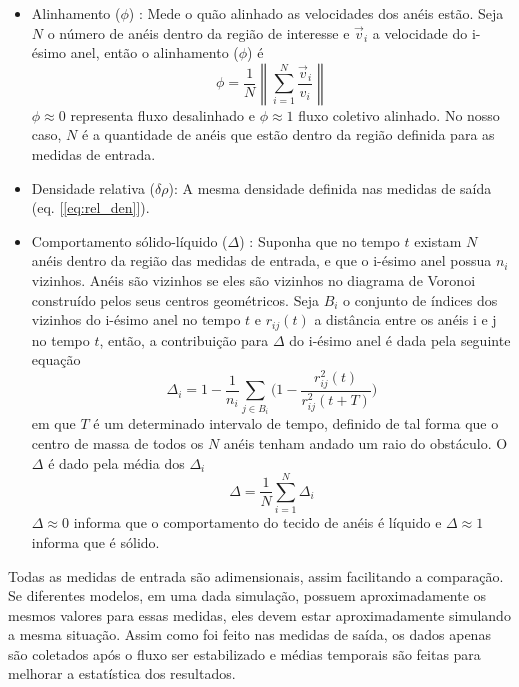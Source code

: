 \documentclass{article}
\theoremstyle{definition}
\newcommand\norm[1]{\left\lVert#1\right\rVert}
\begin{document}
\begin{itemize}
    \item Alinhamento ($\phi$) \cite{vicsek_novel_1995}: Mede o quão alinhado as velocidades dos anéis estão. Seja $N$ o número de anéis dentro da região de interesse e $\vec v_{i}$ a velocidade do i-ésimo anel, então o alinhamento ($\phi$) é
    \begin{equation}
    \phi = \frac{1}{N} \norm{\sum_{i=1}^N \frac{\vec v_{i}}{v_{i}}}
    \label{eq:input_alignment}
    \end{equation}
    $\phi \approx 0$ representa fluxo desalinhado e $\phi \approx 1$ fluxo coletivo alinhado. No nosso caso, $N$ é a quantidade de anéis que estão dentro da região definida para as medidas de entrada.

    \item Densidade relativa ($\delta \rho$): A mesma densidade definida nas medidas de saída (eq. [\ref{eq:rel_den}]).

    \item Comportamento sólido-líquido ($\Delta$) \cite{gregoire_moving_2003}: Suponha que no tempo $t$ existam $N$ anéis dentro da região das medidas de entrada, e que o i-ésimo anel possua $n_i$ vizinhos. Anéis são vizinhos se eles são vizinhos no diagrama de Voronoi \cite{voronoi} construído pelos seus centros geométricos. Seja $B_i$ o conjunto de índices dos vizinhos do i-ésimo anel no tempo $t$ e $r_{ij}(t)$ a distância entre os anéis i e j no tempo $t$, então, a contribuição para $\Delta$ do i-ésimo anel é dada pela seguinte equação
    \begin{equation}
    \Delta_i = 1 - \frac{1}{n_i}\sum_{j \in B_i}\bigg(1 - \frac{r_{ij}^2(t)}{r_{ij}^2(t + T)} \bigg)
    \label{eq:delta_i}
    \end{equation}
    em que $T$ é um determinado intervalo de tempo, definido de tal forma que o centro de massa de todos os $N$ anéis tenham andado um raio do obstáculo. O $\Delta$ é dado pela média dos $\Delta_i$
    \begin{equation}
        \Delta = \frac{1}{N}\sum_{i=1}^N\Delta_i
        \label{eq:delta}
    \end{equation}
    $\Delta \approx 0$ informa que o comportamento do tecido de anéis é líquido e $\Delta \approx 1$ informa que é sólido. 
\end{itemize}
Todas as medidas de entrada são adimensionais, assim facilitando a comparação. Se diferentes modelos, em uma dada simulação, possuem aproximadamente os mesmos valores para essas medidas, eles devem estar aproximadamente simulando a mesma situação. Assim como foi feito nas medidas de saída, os dados apenas são coletados após o fluxo ser estabilizado e médias temporais são feitas para melhorar a estatística dos resultados.
\end{document}
